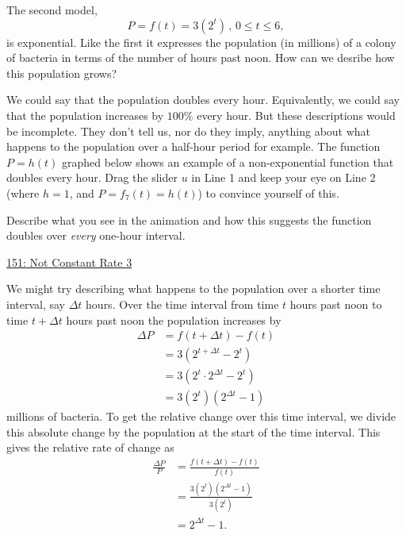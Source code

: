 \documentclass{ximera}
\begin{document}

The second model,
\[
   P =f(t) =3 (2^t) \, , \, 0\leq t \leq 6 ,
\]
is exponential. Like the first it expresses the population (in millions) of a colony of bacteria in terms of the number of hours past noon. How can we desribe how this population grows?

We could say that the population doubles every hour. Equivalently, we could say that the population increases by $100\%$ every hour. But these descriptions would be incomplete. They don't tell us, nor do they imply, anything about what happens to the population over a half-hour period for example. The function $P=h(t)$ graphed below shows an example of a non-exponential function that doubles every hour. Drag the slider $u$ in Line 1 and keep your eye on Line 2 (where $h=1$, and $P=f_7(t) = h(t)$) to convince yourself of this.

\begin{question} \label{WEWMRNERer}
Describe what you see in the animation and how this suggests the function doubles over \emph{every} one-hour interval.
\begin{freeResponse}
\end{freeResponse}

\href{https://www.desmos.com/calculator/zapwlt6qju}{151: Not Constant Rate 3} 

 
\begin{onlineOnly}
    \begin{center}
\end{center}
\end{onlineOnly}

\end{question}

We might try describing what happens to the population over a shorter time interval, say $\Delta t$ hours. Over the time interval from time $t$ hours past noon to time $t+\Delta t$ hours past noon the population increases by 
\begin{align*}
  \Delta P &=  f(t + \Delta t) - f(t)  \\ 
                               &=  3 (2^{t+\Delta t} - 2^t) \\
                               &=  3 (2^t \cdot 2^{\Delta t} - 2^t) \\
                               &=  3 (2^t) (2^{\Delta t} - 1) 
\end{align*}
millions of bacteria. To get the relative change over this time interval, we divide this absolute change by the population at the start of the time interval. This gives the relative rate of change as
\begin{align*}
   \frac{\Delta P}{P} &=  \frac{f(t + \Delta t) - f(t)}{f(t)}  \\ 
                              &= \frac{3 (2^t) (2^{\Delta t} - 1)}{3 (2^t)} \\
                              &= 2^{\Delta t} - 1.
\end{align*}
\end{document}
